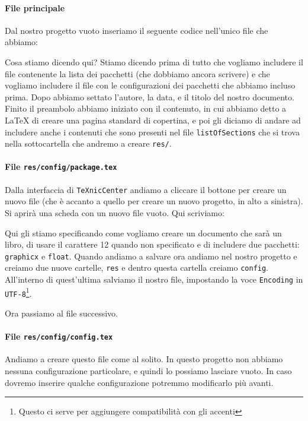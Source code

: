 \paragraph*{File principale} Dal nostro progetto vuoto inseriamo il seguente
codice nell'unico file che abbiamo:



\noindent Cosa stiamo dicendo qui? Stiamo dicendo prima di tutto che vogliamo
includere il file contenente la lista dei pacchetti (che dobbiamo ancora
scrivere) e che vogliamo includere il file con le configurazioni dei pacchetti
che abbiamo incluso prima. Dopo abbiamo settato l'autore, la data, e il titolo
del nostro documento.
Finito il preambolo abbiamo iniziato con il contenuto, in cui abbiamo detto a
\LaTeX{} di creare una pagina standard di copertina, e poi gli diciamo di
andare ad includere anche i contenuti che sono presenti nel file
\texttt{listOfSections} che si trova nella sottocartella che andremo a creare
\texttt{res/}.

\paragraph*{File \texttt{res/config/package.tex}} Dalla interfaccia di
\texttt{TeXnicCenter} andiamo a cliccare il bottone per creare un nuovo file
(che è accanto a quello per creare un nuovo progetto, in alto a sinistra). Si
aprirà una scheda con un nuovo file vuoto. Qui scriviamo:



\noindent Qui gli stiamo specificando come vogliamo creare un documento che
sarà un libro, di usare il carattere 12 quando non specificato e di includere
due pacchetti: \texttt{graphicx} e \texttt{float}.
Quando andiamo a salvare ora andiamo nel nostro progetto e creiamo due nuove
cartelle, \texttt{res} e dentro questa cartella creiamo \texttt{config}.
All'interno di quest'ultima salviamo il nostro file, impostando la voce
\texttt{Encoding} in \texttt{UTF-8}\footnote{Questo ci serve per aggiungere
compatibilità con gli accenti}.

Ora passiamo al file successivo.

\paragraph*{File \texttt{res/config/config.tex}} Andiamo a creare questo file
come al solito. In questo progetto non abbiamo nessuna configurazione
particolare, e quindi lo possiamo lasciare vuoto. In caso dovremo inserire
qualche configurazione potremmo modificarlo più avanti.

